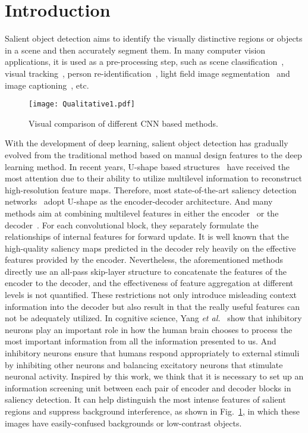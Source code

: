 \documentclass[runningheads]{llncs}
\begin{document}
	
	\section{Introduction}
	Salient object detection aims to identify the visually distinctive regions or objects in a scene and then accurately segment them. In many computer vision applications, it is used as a pre-processing step, such as scene classification~\cite{classification}, visual tracking~\cite{tracking}, person re-identification~\cite{Reid}, light field image segmentation~\cite{LFSD_CNNs} and image captioning~\cite{Imagecaption}, etc. 
	\begin{figure}
		\centering
		\texttt{[image: Qualitative1.pdf]}
		\caption{Visual comparison of different CNN based methods.}\label{fig:Qualitative1}
\end{figure}
	
	With the development of deep learning, salient object detection has gradually evolved from the traditional method based on manual design features to the deep learning method. In recent years, U-shape based structures~\cite{Unet,FPN} have received the most attention due to their ability to utilize multilevel information to reconstruct high-resolution feature maps. Therefore, most state-of-the-art saliency detection networks~\cite{DHS,DSS,Amulet,DGRL,BMPM,PAGRN,PASE,BASNet,MINet} adopt U-shape as the encoder-decoder architecture. And many methods aim at combining multilevel features in either the encoder~\cite{Amulet,DGRL,BMPM,PASE,BASNet,CPD} or the decoder~\cite{DHS,DSS,PAGRN,CPD}. For each convolutional block, they separately formulate the relationships of internal features for forward update. It is well known that the high-quality saliency maps predicted in the decoder rely heavily on the effective features provided by the encoder. Nevertheless, the aforementioned methods directly use an all-pass skip-layer structure to concatenate the features of the encoder to the decoder, and the effectiveness of feature aggregation at different levels is not quantified. These restrictions not only introduce misleading context information into the decoder but also result in that the really useful features can not be adequately utilized. In cognitive science, Yang \textit{et al.}~\cite{NM} show that inhibitory neurons play an important role in how the human brain chooses to process the most important information from all the information presented to us. And inhibitory neurons ensure that humans respond appropriately to external stimuli by inhibiting other neurons and balancing excitatory neurons that stimulate neuronal activity. Inspired by this work, we think that it is necessary to set up an information screening unit between each pair of encoder and decoder blocks in saliency detection. It can help distinguish the most intense features of salient regions and suppress background interference, as shown in Fig.~\ref{fig:Qualitative1}, in which these images have easily-confused backgrounds or low-contrast objects.
	
\end{document}
